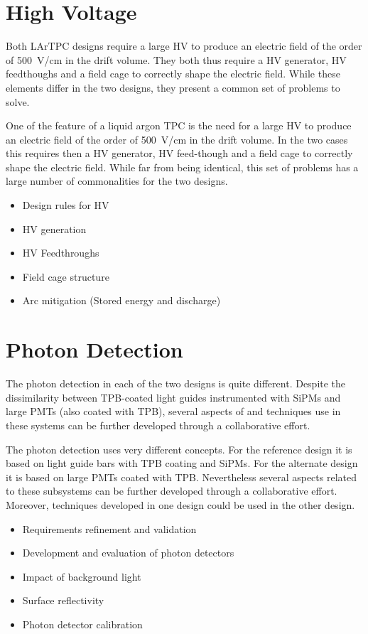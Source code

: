 \section{High Voltage}

Both LArTPC designs require a large HV to
produce an electric field of the order of 500~V/cm in the drift
volume.  They both thus require a HV generator, HV
feedthoughs and a field cage to correctly shape the electric
field. While these elements differ in the two designs, they present a common
set of problems to solve. 
 
One of the feature of a liquid argon TPC is the need for a large HV to
produce an electric field of the order of 500~V/cm in the drift
volume.  In the two cases this requires then a HV generator, HV
feed-though and a field cage to correctly shape the electric
field. While far from being identical, this set of problems has a
large number of commonalities for the two designs.
\begin{itemize}
\item Design rules for HV
\item HV generation
\item HV Feedthroughs
\item Field cage structure
\item Arc mitigation (Stored energy and discharge)
\end{itemize}


 
\section{Photon Detection}

The photon detection in each of the two designs is quite different.
Despite the dissimilarity between TPB-coated light guides instrumented with SiPMs 
and large PMTs (also coated with TPB), several aspects of and techniques use in these systems can be
further developed through a collaborative effort.  

The photon detection uses very different concepts. For the reference
design it is based on light guide bars with TPB coating and SiPMs.
For the alternate design it is based on large PMTs coated with
TPB. Nevertheless several aspects related to these subsystems can be
further developed through a collaborative effort.  Moreover,
techniques developed in one design could be used in the other design.
\begin{itemize}
\item Requirements refinement and validation
\item Development and evaluation of photon detectors 
\item Impact of background light
\item  Surface reflectivity
\item Photon detector calibration
\end{itemize}


